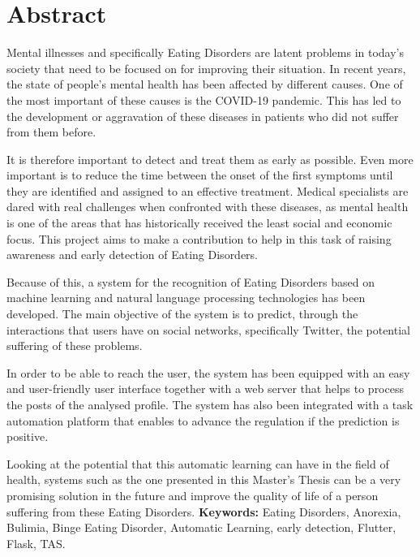 \cleardoublepage
{}
\chapter*{Abstract}

Mental illnesses and specifically Eating Disorders are latent problems in today's society that need to be focused on for improving their situation. In recent years, the state of people's mental health has been affected by different causes. One of the most important of these causes is the COVID-19 pandemic. This has led to the development or aggravation of these diseases in patients who did not suffer from them before.

It is therefore important to detect and treat them as early as possible. Even more important is to reduce the time between the onset of the first symptoms until they are identified and assigned to an effective treatment. Medical specialists are dared with real challenges when confronted with these diseases, as mental health is one of the areas that has historically received the least social and economic focus. This project aims to make a contribution to help in this task of raising awareness and early detection of Eating Disorders.

Because of this, a system for the recognition of Eating Disorders based on machine learning and natural language processing technologies has been developed. The main objective of the system is to predict, through the interactions that users have on social networks, specifically Twitter, the potential suffering of these problems.

In order to be able to reach the user, the system has been equipped with an easy and user-friendly user interface together with a web server that helps to process the posts of the analysed profile. The system has also been integrated with a task automation platform that enables to advance the regulation if the prediction is positive.

Looking at the potential that this automatic learning can have in the field of health, systems such as the one presented in this Master's Thesis can be a very promising solution in the future and improve the quality of life of a person suffering from these Eating Disorders.
\vfill
\textbf{Keywords:} Eating Disorders, Anorexia, Bulimia, Binge Eating Disorder, Automatic Learning, early detection, Flutter, Flask, TAS.